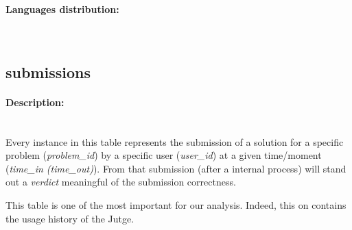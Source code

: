 \paragraph{Languages distribution:}~\\ %

\newpage
\subsection{submissions} %
\label{sub:submissions}

\begin{figure}
  \vspace{-20pt}
  \begin{center}
  \end{center}
  \vspace{-20pt}
\end{figure}

\paragraph{Description:}~\\ %

Every instance in this table represents the submission of a solution for a specific problem (\emph{problem\_id}) by a specific user (\emph{user\_id}) at a given time/moment (\emph{time\_in (time\_out)}). From that submission (after a internal process) will stand out a \emph{verdict} meaningful of the submission correctness.

This table is one of the most important for our analysis. Indeed, this on contains the usage history of the Jutge.

